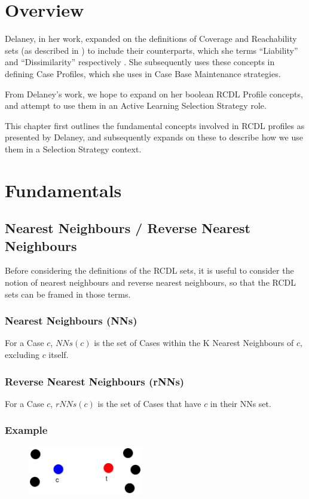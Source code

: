 \documentclass[a4paper,11pt]{report}
\begin{document}
\section{Overview}

Delaney, in her work, expanded on the definitions of Coverage and Reachability sets (as described in \citet{Smyth1995}) to include their counterparts, which she terms ``Liability'' and ``Dissimilarity'' respectively \citep{Delany2009}. She subsequently uses these concepts in defining Case Profiles, which she uses in Case Base Maintenance strategies.

From Delaney's work, we hope to expand on her boolean RCDL Profile concepts, and attempt to use them in an Active Learning Selection Strategy role.

This chapter first outlines the fundamental concepts involved in RCDL profiles as presented by Delaney, and subsequently expands on these to describe how we use them in a Selection Strategy context.

\section{Fundamentals}
\subsection{Nearest Neighbours / Reverse Nearest Neighbours}
Before considering the definitions of the RCDL sets, it is useful to consider the notion of nearest neighbours and reverse nearest neighbours, so that the RCDL sets can be framed in those terms.

\subsubsection{Nearest Neighbours (NNs)}
For a Case $c$, $ NNs(c) $ is the set of Cases within the K Nearest Neighbours of $c$, excluding $c$ itself.

\subsubsection{Reverse Nearest Neighbours (rNNs)}
For a Case $c$, $ rNNs(c) $ is the set of Cases that have $c$ in their NNs set.

\subsubsection{Example}
\begin{figure}[h!] \centering
\includegraphics[width=5cm]{./Drawn/RcdlNnRnnEg}
\end{figure}
\end{document}
